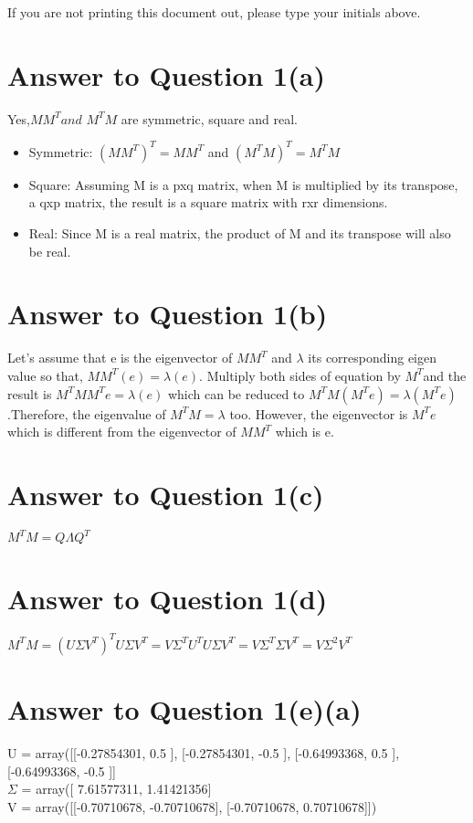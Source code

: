 \documentclass[11pt]{article}
\begin{document}
If you are not printing this document out, please type your initials above.

\vfill
\vfill

\pagebreak[4]
\section*{Answer to Question 1(a)}
Yes,$MM^{T} and$ $M^{T}M$ are symmetric, square and real.\\
\begin{itemize}
\item Symmetric: $(MM^{T})^T = MM^{T}$ and $(M^{T}M)^T = M^{T}M$
\item Square: Assuming M is a pxq matrix, when M is multiplied by its transpose, a qxp matrix, the result is a square matrix with rxr dimensions.
\item Real: Since M is a real matrix, the product of M and its transpose will also be real.
\end{itemize}
\section*{Answer to Question 1(b)}
Let's assume that e is the eigenvector of $MM^T$ and $\lambda$ its corresponding eigen value so that, $MM^T(e) = \lambda (e)$.
Multiply both sides of equation by $M^T$and the result is 
$M^TMM^Te = \lambda (e)$ which can be reduced to 
$M^TM(M^Te) = \lambda(M^Te)$.Therefore, the eigenvalue of $M^TM = \lambda$ too. However, the eigenvector is $M^Te$ which is different from the eigenvector of $MM^T$ which is e.
\section*{Answer to Question 1(c)}
$M^TM = Q\Lambda Q^T$
\section*{Answer to Question 1(d)}
$M^TM = (U \Sigma V^T)^T U \Sigma V^T = V\Sigma^T U^T U\Sigma V^T =   V\Sigma^T \Sigma V^T =  V\Sigma^2 V^T$
\section*{Answer to Question 1(e)(a)}
U = array([[-0.27854301,  0.5       ],
       [-0.27854301, -0.5       ],
       [-0.64993368,  0.5       ],
       [-0.64993368, -0.5       ]] \\
$\Sigma$ =  array([ 7.61577311,  1.41421356] \\
V = array([[-0.70710678, -0.70710678],
       [-0.70710678,  0.70710678]])
\end{document}

